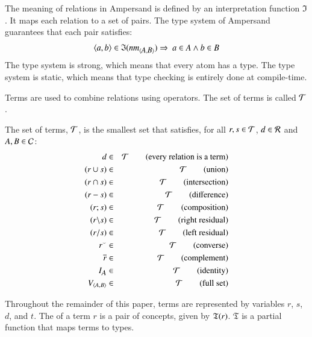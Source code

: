 \documentclass{elsarticle}
\begin{document}
	The meaning of relations in Ampersand is defined by an interpretation function $\mathfrak{I}$.
	It maps each relation to a set of pairs.
	The type system of Ampersand guarantees that each pair satisfies:
\begin{equation}
	\langle{a},{b}\rangle\in\mathfrak{I}(\text{\em nm\/}_{\langle{\text{\em \small A\/}},{\text{\em \small B\/}}\rangle}) \Rightarrow\ a \in A \wedge b \in B \label{typing of relations}
\end{equation}
	The type system is strong, which means that every atom has a type.
	The type system is static, which means that type checking is entirely done at compile-time.

	Terms are used to combine relations using operators.
	The set of terms is called $\mathcal{T}$.
\begin{definition}[terms]
\label{def:terms}
\item   The set of terms, $\mathcal{T}$, is the smallest set that satisfies, for all $r,s \in \mathcal{T}$, $d\in\mathcal{R}$ and $A,B \in \mathcal{C}$: 
\begin{eqnarray}
	d&\in&\mathcal{T}         \quad\quad\text{(every relation is a term)}\\
	(r \cup s)&\in&\mathcal{T}\quad\quad\text{(union)}\\
	(r \cap s)&\in&\mathcal{T}\quad\quad\text{(intersection)}\\
	(r-s)&\in&\mathcal{T}     \quad\quad\text{(difference)}\label{def:difference}\\
	(r;s)&\in&\mathcal{T}     \quad\quad\text{(composition)}\\
	(r\backslash s)&\in&\mathcal{T}     \quad\quad\text{(right residual)}\\
	(r\slash s)&\in&\mathcal{T}     \quad\quad\text{(left residual)}\\
	{r}^\smallsmile&\in&\mathcal{T}   \quad\quad\text{(converse)}\\
	\overline{r}&\in&\mathcal{T}   \quad\quad\text{(complement)}\\
	I_{\text{\em \small A\/}}&\in&\mathcal{T} \quad\quad\text{(identity)}\\
	V_{\langle{A},{B}\rangle}&\in&\mathcal{T} \quad\quad\text{(full set)}
\end{eqnarray}
\end{definition}
	Throughout the remainder of this paper,	terms are represented by variables $r$, $s$, $d$, and $t$.
	The  of a term $r$ is a pair of concepts, given by $\mathfrak{T}(r)$.
	$\mathfrak{T}$ is a partial function that maps terms to types.
\end{document}
